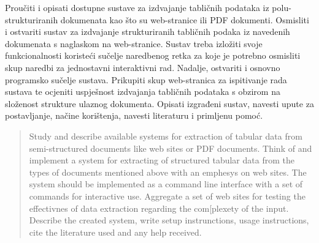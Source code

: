 \documentclass[times, utf8, zavrsni]{fer}
\begin{document}



\begin{sazetak}

Proučiti i opisati dostupne sustave za izdvajanje tabličnih podataka iz
polu-strukturiranih dokumenata kao što su web-stranice ili PDF dokumenti.
Osmisliti i ostvariti sustav za izdvajanje strukturiranih tabličnih podaka iz
navedenih dokumenata s naglaskom na web-stranice.
Sustav treba izložiti svoje funkcionalnosti koristeći sučelje naredbenog retka
za koje je potrebno osmisliti skup naredbi za jednostavni interaktivni rad.
Nadalje, ostvariti i osnovno programsko sučelje sustava. Prikupiti skup
web-stranica za ispitivanje rada sustava te ocjeniti uspješnost izdvajanja
tabličnih podataka s obzirom na složenost strukture ulaznog dokumenta. Opisati
izgrađeni sustav, navesti upute za postavljanje, načine korištenja, navesti
literaturu i primljenu pomoć.

\kljucnerijeci{}
\end{sazetak}

\begin{abstract}

Study and describe available systems for extraction of tabular data from
semi-structured documents like web sites or PDF documents. Think of and
implement a system for extracting of structured tabular data from the types of
documents mentioned above with an emphesys on web sites.
The system should be implemented as a command line interface with a set of
commands for interactive use. Aggregate a set of web sites for testing the
effectivnes of data extraction regarding the com[plexety of the input.
Describe the created system, write setup instrunctions, usage instructions,
cite the literature used and any help received.

\keywords{}
\end{abstract}
\end{document}
